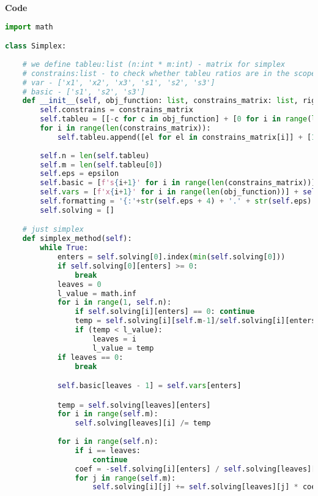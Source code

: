 \documentclass[12pt, legalpaper]{exam}
\begin{document}
\vspace{24pt}
\noindent    
\newpage
\textbf{Code}

\begin{lstlisting}[language=Python, caption=Программа на Python, label=lst:python-code]
import math

class Simplex:
    
    # we define tableu:list (n:int * m:int) - matrix for simplex
    # constrains:list - to check whether tableu ratios are in the scope of them
    # var - ['x1', 'x2', 'x3', 's1', 's2', 's3']
    # basic - ['s1', 's2', 's3']
    def __init__(self, obj_function: list, constrains_matrix: list, right_hand_side_num: list, epsilon:int):
        self.constrains = constrains_matrix
        self.tableu = [[-c for c in obj_function] + [0 for i in range(len(constrains_matrix))] + [0]]
        for i in range(len(constrains_matrix)):
            self.tableu.append([el for el in constrains_matrix[i]] + [1 if i == j else 0 for j in range(len(constrains_matrix))] + [right_hand_side_num[i]])
        
        self.n = len(self.tableu)
        self.m = len(self.tableu[0])
        self.eps = epsilon
        self.basic = [f's{i+1}' for i in range(len(constrains_matrix))]
        self.vars = [f'x{i+1}' for i in range(len(obj_function))] + self.basic
        self.formatting = '{:'+str(self.eps + 4) + '.' + str(self.eps) + 'f}'
        self.solving = []

    # just simplex 
    def simplex_method(self):
        while True:
            enters = self.solving[0].index(min(self.solving[0]))
            if self.solving[0][enters] >= 0:
                break
            leaves = 0
            l_value = math.inf
            for i in range(1, self.n):
                if self.solving[i][enters] == 0: continue
                temp = self.solving[i][self.m-1]/self.solving[i][enters]
                if (temp < l_value):
                    leaves = i
                    l_value = temp
            if leaves == 0:
                break

            self.basic[leaves - 1] = self.vars[enters]

            temp = self.solving[leaves][enters]
            for i in range(self.m):
                self.solving[leaves][i] /= temp
        
            for i in range(self.n):
                if i == leaves:
                    continue
                coef = -self.solving[i][enters] / self.solving[leaves][enters]
                for j in range(self.m):
                    self.solving[i][j] += self.solving[leaves][j] * coef


\end{lstlisting}
\end{document}
